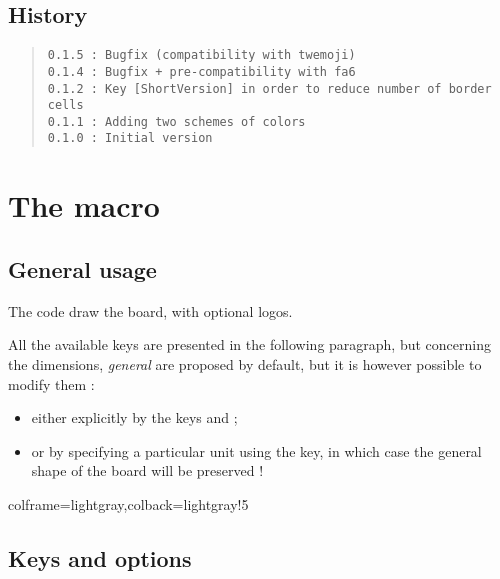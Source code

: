 \documentclass[11pt,a4paper]{ltxdoc}
\begin{document}
\vfill

\subsection{History}

\begin{quote}
\begin{verbatim}
0.1.5 : Bugfix (compatibility with twemoji)
0.1.4 : Bugfix + pre-compatibility with fa6
0.1.2 : Key [ShortVersion] in order to reduce number of border cells
0.1.1 : Adding two schemes of colors
0.1.0 : Initial version
\end{verbatim}
\end{quote}

\pagebreak

\section{The macro}

\subsection{General usage}

The code draw the board, with optional logos.

All the available keys are presented in the following paragraph, but concerning the dimensions, \textit{general} are proposed by default, but it is however possible to modify them :

\begin{itemize}
	\item either explicitly by the keys \MontreCode{[Radius=]} and \MontreCode{[BorderHeight=]};
	\item or by specifying a particular unit using the \MontreCode{[Unit=]} key, in which case the general shape of the board will be preserved !
\end{itemize}

\begin{tcblisting}{colframe=lightgray,colback=lightgray!5}
\BoardTrivialPursuit[Unit=0.5]
%
\BoardTrivialPursuit[Radius=4,BorderHeight=1.25] %

\BoardTrivialPursuit[Unit=0.33]
%
\BoardTrivialPursuit[Unit=0.33,ShortVersion]
\end{tcblisting}

\pagebreak

\subsection{Keys and options}
\end{document}
